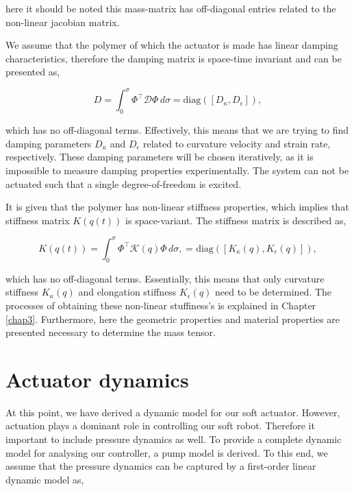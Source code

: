 here it should be noted this mass-matrix has off-diagonal entries related to the non-linear jacobian matrix. 

We assume that the polymer of which the actuator is made has linear damping characteristics, therefore the damping matrix is space-time invariant and can be presented as,

\begin{equation}
    D = \int_0^\sigma \Phi^\top \mathcal{D} \Phi \hspace{2pt} d \sigma  = \text{diag}([D_\kappa, D_\epsilon]),
\end{equation}

which has no off-diagonal terms. Effectively, this means that we are trying to find damping parameters $D_\kappa$ and $D_\epsilon$ related to curvature velocity and strain rate, respectively. These damping parameters will be chosen iteratively, as it is impossible to measure damping properties experimentally. The system can not be actuated such that a single degree-of-freedom is excited. 

It is given that the polymer has non-linear stiffness properties, which implies that stiffness matrix $K(q(t))$ is space-variant. The stiffness matrix is described as,

\begin{equation}
    K(q(t)) = \int_0^\sigma \Phi^\top \mathcal{K}(q) \Phi \hspace{2pt} d\sigma, = \text{diag}([K_\kappa(q), K_\epsilon(q)]),
\end{equation}

which has no off-diagonal terms. Essentially, this means that only curvature stiffness $K_\kappa(q)$ and elongation stiffness $K_\epsilon(q)$ need to be determined. The processes of obtaining these non-linear stuffiness's is explained in Chapter \ref{chap3}. Furthermore, here the geometric properties and material properties are presented necessary to determine the mass tensor. 




\section{Actuator dynamics}

At this point, we have derived a dynamic model for our soft actuator. However, actuation plays a dominant role in controlling our soft robot. Therefore it important to include pressure dynamics as well. To provide a complete dynamic model for analysing our controller, a pump model is derived. To this end, we assume that the pressure dynamics can be captured by a first-order linear dynamic model as,

